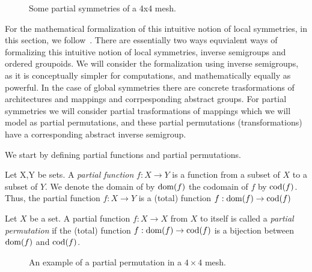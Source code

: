 \begin{figure}[h]
	\centering
   \resizebox{0.55\textwidth}{!}{}
	\caption{Some partial symmetries of a 4x4 mesh.}
	\label{fig:partial_symmetries_4x4}
\end{figure}

For the mathematical formalization of this intuitive notion of local symmetries, in this section, we follow~\cite{lawson_inverse_semigroups}.
There are essentially two ways equvialent ways of formalizing this intuitive notion of local symmetries, inverse semigroups and ordered groupoids.
We will consider the formalization using inverse semigroups, as it is conceptually simpler for computations, and mathematically equally as powerful.
In the case of global symmetries there are concrete trasformations of architectures and mappings and corrpesponding abstract groups. For partial symmetries we will consider partial trasformations of mappings which we will model as partial permutations, and these partial permutations (transformations) have a corresponding abstract inverse semigroup.

We start by defining partial functions and partial permutations.
\begin{defn}
Let X,Y be sets.
A \emph{partial function} $f: X \rightarrow Y$ is a function from a subset of $X$ to a subset of $Y$.
We denote the domain of by $\operatorname{dom}(f)$ the codomain of $f$ by $\operatorname{cod}(f)$.
Thus, the partial function $f: X \rightarrow Y$ is a (total) function $f: \operatorname{dom}(f) \rightarrow \operatorname{cod}(f)$
\end{defn}

\begin{defn}
Let $X$ be a set.
A partial function $f: X \rightarrow X$ from $X$ to itself is called a \emph{partial permutation} if the (total) function $f: \operatorname{dom}(f) \rightarrow \operatorname{cod}(f)$ is a bijection between $\operatorname{dom}(f)$ and $\operatorname{cod}(f)$.
\end{defn}

\begin{figure}[h]
	\centering
   \resizebox{0.55\textwidth}{!}{}
	\caption{An example of a partial permutation in a $4 \times 4$ mesh.}
	\label{fig:example_partial_permutation}
\end{figure}

